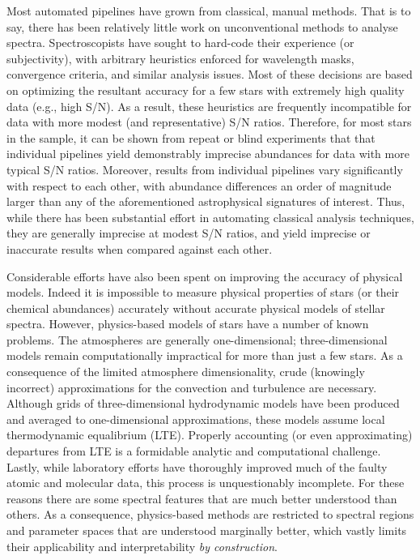 \documentclass[12pt,preprint]{aastex}
\begin{document}
Most automated pipelines have grown from classical, manual methods.  That is to
say, there has been relatively little work on unconventional methods to analyse
spectra.  Spectroscopists have sought to hard-code their experience (or 
subjectivity), with arbitrary heuristics enforced for wavelength masks, 
convergence criteria, and similar analysis issues.  Most of these decisions are 
based on optimizing the resultant accuracy for a few stars with extremely high 
quality data (e.g., high S/N).  As a result, these heuristics are frequently 
incompatible for data with more modest (and representative) S/N ratios.  
Therefore, for most stars in the sample, it can be shown from repeat or blind 
experiments that that individual pipelines yield demonstrably imprecise 
abundances for data with more typical S/N ratios.  Moreover, results from 
individual pipelines vary significantly with respect to each other, with 
abundance differences an order of magnitude larger than any of the 
aforementioned astrophysical signatures of interest.  Thus, while there has been
substantial effort in automating classical analysis techniques, they are 
generally imprecise at modest S/N ratios, and yield imprecise or inaccurate 
results when compared against each other.


Considerable efforts have also been spent on improving the accuracy of physical
models.  Indeed it is impossible to measure physical properties of stars (or 
their chemical abundances) accurately without accurate physical models of 
stellar spectra.  However, physics-based models of stars have a number of known
problems.  The atmospheres are generally one-dimensional; three-dimensional
models remain computationally impractical for more than just a few stars.  As a
consequence of the limited atmosphere dimensionality, crude (knowingly 
incorrect) approximations for the convection and turbulence are necessary. 
Although grids of three-dimensional hydrodynamic models have been produced 
and averaged to one-dimensional approximations, these models assume local
thermodynamic equalibrium (LTE).  Properly accounting (or even approximating) 
departures from LTE is a formidable analytic and computational challenge.
Lastly, while laboratory efforts have thoroughly improved much of the faulty
atomic and molecular data, this process is unquestionably incomplete. For these
reasons there are some spectral features that are much better understood than
others.  As a consequence, physics-based methods are restricted to spectral
regions and parameter spaces that are understood marginally better, which vastly
limits their applicability and interpretability \emph{by construction}.
\end{document}
